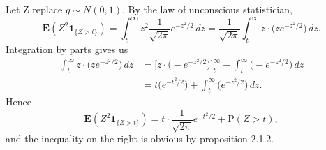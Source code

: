 \documentclass[11pt]{article}
\renewcommand{\Pr}{\mathrm{P}}
\newcommand{\E}{\mathbf{E}}
\newcommand{\I}[1]{\mathbf{1}_{\{#1\}}}
\theoremstyle{plain}
\theoremstyle{definition}
\theoremstyle{remark}
\theoremstyle{definition}
\newenvironment{mansol}[1]{%
  \renewcommand\themansolinner{#1}%
  \mansolinner
}{\endmansolinner}
\begin{document}
\begin{mansol}{2.1.4}
Let Z replace $g \sim N(0,1)$. By the law of unconscious statistician, 
\[
\E(Z^2 \I{Z > t}) = \int_t^\infty z^2 \frac{1}{\sqrt{2\pi}} e^{-z^2 / 2}\,dz 
= \frac{1}{\sqrt{2\pi}}\int_t^\infty z \cdot \bigl(z e^{-z^2 / 2}\bigr)\,dz.
\]
Integration by parts gives us \begin{align*}
\int_t^\infty z \cdot \bigl(z e^{-z^2 / 2}\bigr)\,dz & = \bigl[z \cdot \bigl(- e^{-z^2 / 2}\bigr)\bigr]_t^\infty - \int_t^\infty \bigl(- e^{-z^2/2}\bigr)\,dz \\
& = t \bigl(e^{-t^2 / 2}\bigr) + \int_t^\infty \bigl(e^{-z^2/2}\bigr)\,dz.
\end{align*}
Hence \[
\E(Z^2 \I{Z > t}) = t \cdot \frac{1}{\sqrt{2\pi}} e^{-t^2/2} + \Pr(Z > t),
\] and the inequality on the right is obvious by proposition 2.1.2.
\end{mansol}
\end{document}
